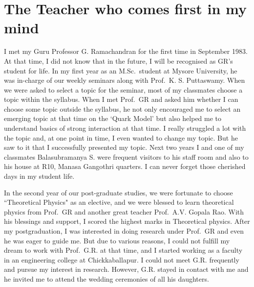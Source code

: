 \chapter{The Teacher who comes first in my mind}\label{chap33}



I met my Guru Professor G. Ramachandran for the first time in September 1983. At that time, I did not know that in the future, I will be recognised as GR's student for life. In my first year as an M.Sc.\ student at Mysore University, he was in-charge of our weekly seminars along with Prof.\ K. S. Puttaswamy. When we were asked to select a topic for the seminar, most of my classmates choose a topic within the syllabus. When I met Prof.\ GR and asked him whether I can choose some topic outside the syllabus, he not only encouraged me to select an emerging topic at that time on the `Quark Model' but also helped me to understand basics of strong interaction at that time. I really struggled a lot with the topic and, at one point in time, I even wanted to change my topic. But he saw to it that I successfully presented my topic. Next two years I and one of my classmates Balasubramanya S. were frequent visitors to his staff room and also to his house at R10, Manasa Gangothri quarters. I can never forget those cherished days in my student life. 

In the second year of our post-graduate studies, we were fortunate to choose ``Theoretical Physics" as an elective, and we were blessed to learn theoretical physics from Prof.\ GR and another great teacher Prof.\ A.V. Gopala Rao. With his blessings and support, I scored the highest marks in Theoretical physics. After my postgraduation, I was interested in doing research under Prof.\ GR and even he was eager to guide me. But due to various reasons, I could not fulfill my dream to work with Prof.\ G.R. at that time, and I started working as a faculty in an engineering college at Chickkaballapur. I could not meet G.R. frequently and pursue my interest in research. However, G.R. stayed in contact with me and he invited me to attend the wedding ceremonies of all his daughters. 

